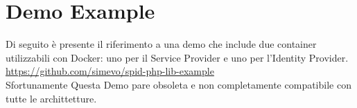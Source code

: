 \section{Demo Example}
Di seguito è presente il riferimento a una demo che include due container utilizzabili con Docker: uno per il Service Provider 
e uno per l'Identity Provider.
\\ \url{https://github.com/simevo/spid-php-lib-example}
\\ Sfortunamente Questa Demo pare obsoleta e non completamente compatibile con tutte le archittetture.
